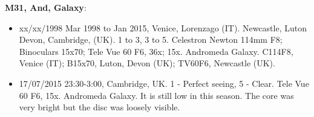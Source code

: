 {\bf M31, And, Galaxy}:
\begin{itemize}
\item xx/xx/1998 Mar 1998 to Jan 2015, Venice, Lorenzago (IT). Newcastle, Luton Devon, Cambridge, (UK). 1 to 3, 3 to 5. Celestron Newton 114mm F8; Binoculars 15x70; Tele Vue 60 F6, 36x; 15x. Andromeda Galaxy. C114F8, Venice (IT); B15x70, Luton, Devon (UK); TV60F6, Newcastle (UK).
\item 17/07/2015 23:30-3:00, Cambridge, UK. 1 - Perfect seeing, 5 - Clear. Tele Vue 60 F6, 15x. Andromeda Galaxy. It is still low in this season. The core was very bright but the disc was loosely visible. 
\end{itemize}
